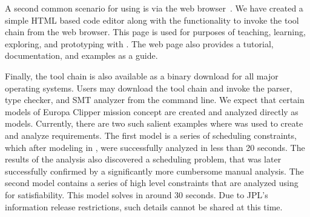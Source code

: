 A second common scenario for using \Klang{} is via the web
browser~\cite{kwebsite}. We have created a simple HTML based \Klang{}
code editor along with the functionality to invoke the \Klang{}
tool chain from the web browser. This page is used for purposes of
teaching, learning, exploring, and prototyping with \Klang{}. The web
page also provides a tutorial, documentation, and \Klang{} examples as
a guide.

Finally, the \Klang{} tool chain is also available as a binary
download for all major operating systems. Users may download the tool
chain and invoke the \Klang{} parser, type checker, and SMT analyzer
from the command line. We expect that certain models of Europa Clipper
mission concept are created and analyzed directly as \Klang{}
models. Currently, there are two such salient examples where \Klang{}
was used to create and analyze requirements. The first model is a
series of scheduling constraints, which after modeling in \Klang{},
were successfully analyzed in less than 20 seconds. The results of the
analysis also discovered a scheduling problem, that was later
successfully confirmed by a significantly more cumbersome manual
analysis. The second model contains a series of high level constraints
that are analyzed using \Klang{} for satisfiability. This model solves
in around 30 seconds. Due to JPL's information release restrictions,
such details cannot be shared at this time.

